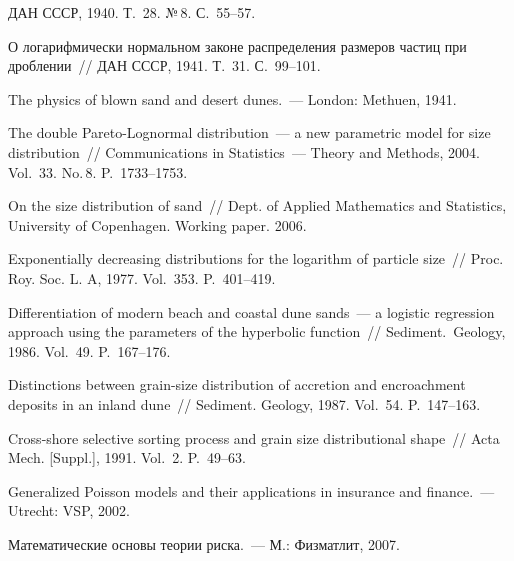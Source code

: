 \begin{multicols}{2}
{\small\frenchspacing
{%
\begin{thebibliography}{99}

ДАН СССР, 1940. Т.~28. №\,8. С.~55--57. %

О логарифмически нормальном законе распределения размеров частиц при дроблении~//
ДАН СССР, 1941. Т.~31. С.~99--101. %

The physics of blown sand and desert dunes.~--- London: Methuen, 1941. %

The double Pareto-Lognormal distribution~--- a new
parametric model for size distribution~// Communications in
Statistics~--- Theory and Methods, 2004. Vol.~33. No.\,8. P.~1733--1753. %

On the size distribution of sand~// Dept. of Applied Mathematics
and Statistics, University of Copenhagen. Working paper. 2006. %

Exponentially decreasing distributions for the logarithm of particle size~//
Proc. Roy. Soc. L. A, 1977. Vol.~353. P.~401--419. %

Differentiation of modern beach and coastal dune sands~--- a logistic regression approach
using the parameters of the hyperbolic function~// Sediment.\
Geology, 1986. Vol.~49. P.~167--176. %

Distinctions between grain-size distribution of accretion and encroachment deposits
in an inland dune~// Sediment. Geology, 1987. Vol.~54. P.~147--163. %

Cross-shore selective sorting process and grain size distributional shape~//
Acta Mech. [Suppl.], 1991. Vol.~2. P.~49--63. %

Generalized Poisson
models and their applications in insurance and finance.~--- Utrecht: VSP, 2002. %

Математические основы теории риска.~--- М.: Физматлит, 2007. %


\end{thebibliography}}}
\end{multicols}
